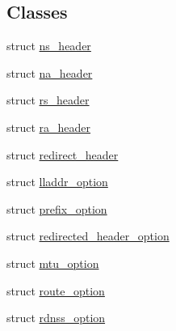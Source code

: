 \subsection*{Classes}
\begin{DoxyCompactItemize}
\item 
struct \hyperlink{structns__header}{ns\+\_\+header}
\item 
struct \hyperlink{structna__header}{na\+\_\+header}
\item 
struct \hyperlink{structrs__header}{rs\+\_\+header}
\item 
struct \hyperlink{structra__header}{ra\+\_\+header}
\item 
struct \hyperlink{structredirect__header}{redirect\+\_\+header}
\item 
struct \hyperlink{structlladdr__option}{lladdr\+\_\+option}
\item 
struct \hyperlink{structprefix__option}{prefix\+\_\+option}
\item 
struct \hyperlink{structredirected__header__option}{redirected\+\_\+header\+\_\+option}
\item 
struct \hyperlink{structmtu__option}{mtu\+\_\+option}
\item 
struct \hyperlink{structroute__option}{route\+\_\+option}
\item 
struct \hyperlink{structrdnss__option}{rdnss\+\_\+option}
\end{DoxyCompactItemize}
